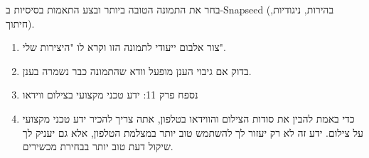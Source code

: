 \begin{tcbpractice}{בחר את התמונה הטובה ביותר ובצע התאמות בסיסיות ב-Snapseed (בהירות, ניגודיות, חיתוך).}
\begin{enumerate}
  \item צור אלבום ייעודי לתמונה הזו וקרא לו "היצירות שלי".
  \item בדוק אם גיבוי הענן מופעל וודא שהתמונה כבר נשמרה בענן.
  \item נספח פרק 11: ידע טכני מקצועי בצילום ווידאו
  \item כדי באמת להבין את סודות הצילום והווידאו בטלפון, אתה צריך להכיר ידע טכני מקצועי על צילום. ידע זה לא רק יעזור לך להשתמש טוב יותר במצלמת הטלפון, אלא גם יעניק לך שיקול דעת טוב יותר בבחירת מכשירים.
\end{enumerate}

\end{tcbpractice}
